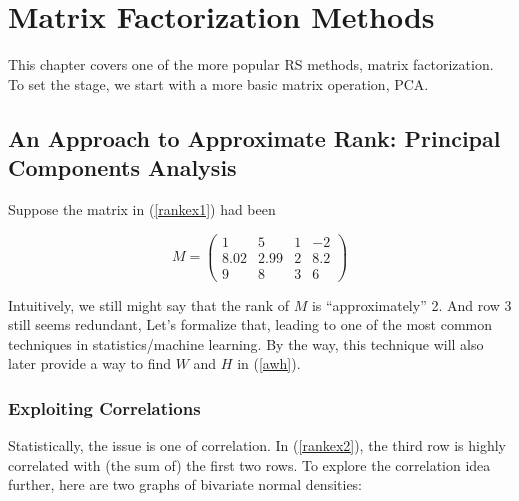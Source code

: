 
\chapter{Matrix Factorization Methods}   

This chapter covers one of the more popular RS methods, matrix
factorization.  To set the stage, we start with a more basic matrix
operation, PCA.

\section{An Approach to Approximate Rank:  Principal Components
Analysis}

Suppose the matrix in (\ref{rankex1}) had been

\begin{equation}
\label{rankex2}
M =
\left (
\begin{array}{rrrr}
1 & 5 & 1 & -2\\
8.02 & 2.99 & 2 & 8.2\\
9 & 8 & 3 & 6 
\end{array}
\right )
\end{equation}

Intuitively, we still might say that the rank of $M$ is
``approximately'' 2.  And row 3 still seems redundant, Let's
formalize that, leading to one of the most common techniques in
statistics/machine learning.  By the way, this technique will also later
provide a way to find $W$ and $H$ in (\ref{awh}).

\subsection{Exploiting Correlations}
\label{explorecorr}

Statistically, the issue is one of correlation.  In (\ref{rankex2}), the
third row is highly correlated with (the sum of) the first two rows.  To
explore the correlation idea further, here are two graphs of bivariate
normal densities:

